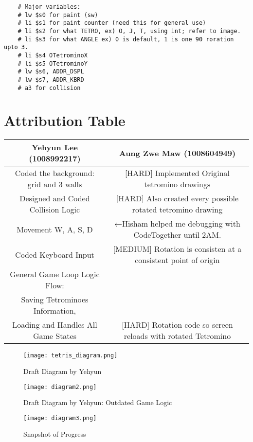 \documentclass{article}
\begin{document}
\begin{enumerate}
\begin{verbatim}
    # Major variables:
    # lw $s0 for paint (sw)
    # li $s1 for paint counter (need this for general use)
    # li $s2 for what TETRO, ex) O, J, T, using int; refer to image.
    # li $s3 for what ANGLE ex) 0 is default, 1 is one 90 roration upto 3.
    # li $s4 OTetrominoX
    # li $s5 OTetrominoY
    # lw $s6, ADDR_DSPL
    # lw $s7, ADDR_KBRD
    # a3 for collision
\end{verbatim}


    
\end{enumerate}

\section{Attribution Table}



\begin{center}
\begin{tabular}{|| c | c ||}
\hline
 Yehyun Lee (1008992217) &  Aung Zwe Maw (1008604949) \\ 
 \hline
 [MEDIUM] Coded the background: grid and 3 walls & [HARD] Implemented Original tetromino drawings\\
 \hline
 [HARD] Designed and Coded Collision Logic & [HARD] Also created every possible rotated tetromino drawing\\
 \hline
 [HARD] Movement W, A, S, D & ←Hisham helped me debugging with CodeTogether until 2AM.\\ 
 \hline
 [EASY] Coded Keyboard Input & [MEDIUM] Rotation is consisten at a consistent point of origin\\ 
 \hline
 [HARD] General Game Loop Logic Flow:\\Saving Tetrominoes Information,\\
 Loading and Handles All Game States & [HARD] Rotation code so screen reloads with rotated Tetromino\\
 \hline
\end{tabular}

\begin{figure}[ht!]
    \centering
    \texttt{[image: tetris\_diagram.png]}
    \caption{Draft Diagram by Yehyun}
    \label{f:1}
\end{figure}

\begin{figure}[ht!]
    \centering
    \texttt{[image: diagram2.png]}
    \caption{Draft Diagram by Yehyun: Outdated Game Logic}
    \label{f:1}
\end{figure}


\begin{figure}[ht!]
    \centering
    \texttt{[image: diagram3.png]}
    \caption{Snapshot of Progress}
    \label{f:1}
\end{figure}


\end{center}
\end{document}
